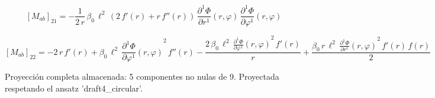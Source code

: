 \documentclass[11pt]{article}
\begin{document}
\par\smallskip
\begin{dmath*}[breakdepth={5}]
\left[M_{ab}\right]_{21} = -\frac{1}{2\,r}\,\beta_{0}\,{\ell}^{2}\,\left(2\,f'\!\left(r\right) + r\,f''\!\left(r\right)\right)\,\frac{\partial^{1} \Phi}{\partial r^{1}}\!\left(r, \varphi\right)\,\frac{\partial^{1} \Phi}{\partial \varphi^{1}}\!\left(r, \varphi\right)
\end{dmath*}
\par\smallskip
\begin{dmath*}[breakdepth={5}]
\left[M_{ab}\right]_{22} = -2\,r\,f'\!\left(r\right) + \beta_{0}\,{\ell}^{2}\,{\frac{\partial^{1} \Phi}{\partial \varphi^{1}}\!\left(r, \varphi\right)}^{2}\,f''\!\left(r\right) - \frac{2\,\beta_{0}\,{\ell}^{2}\,{\frac{\partial^{1} \Phi}{\partial \varphi^{1}}\!\left(r, \varphi\right)}^{2}\,f'\!\left(r\right)}{r} + \frac{\beta_{0}\,r\,{\ell}^{2}\,{\frac{\partial^{1} \Phi}{\partial r^{1}}\!\left(r, \varphi\right)}^{2}\,f'\!\left(r\right)\,f\!\left(r\right)}{2}
\end{dmath*}
\par\smallskip
Proyección completa almacenada: 5 componentes no nulas de 9. Proyectada respetando el ansatz 'draft4\_circular'.\par\medskip
{}
\end{document}
